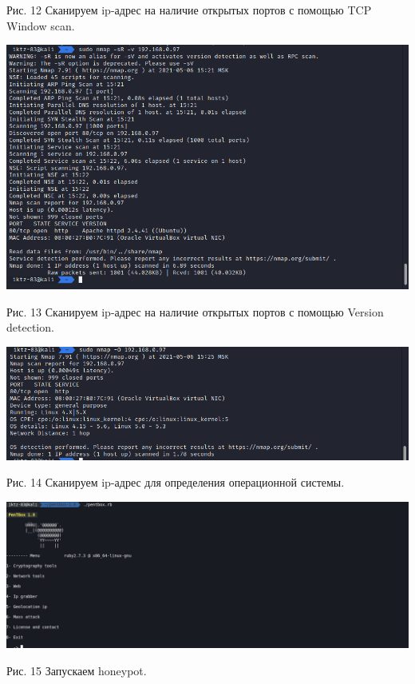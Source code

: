 \documentclass[a4paper,14pt]{extarticle}
\begin{document}
\begin{center}
        Рис. 12 Сканируем ip-адрес на наличие открытых портов с помощью TCP Window scan.
        \vspace{1ex}

        \includegraphics[scale=0.5]{pics/12.png}

        Рис. 13 Сканируем ip-адрес на наличие открытых портов с помощью Version detection.
        \vspace{1ex}

        \includegraphics[scale=0.5]{pics/13.png}
        
        Рис. 14 Сканируем ip-адрес для определения операционной системы. 
        \vspace{1ex}

        \includegraphics[scale=0.35]{pics/13_1.png}
        
        Рис. 15 Запускаем honeypot.
        \vspace{1ex}


\end{center}
\end{document}
